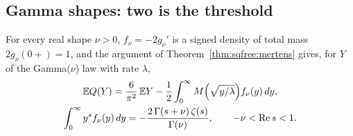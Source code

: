 \begin{table}[htbp]
\centering\footnotesize
\setlength{\tabcolsep}{3.5pt}
\caption{The Gamma(2) smoothed count: $Q_2(x)-6x/\pi^2$, the sum \eqref{eq:sqfree:EQ} truncated at $d\le2\times10^5$, the normalised error, the contribution $2\re\sum_{k\le100}B_{\rho_k}x^{\rho_k/2}$ of the first hundred atoms, the residues at $s=-1,\dots,-6$, whose leading part is $2c_1/x$, and the residual. The constant $1$ is the residue $D(0)$ at $s=0$. Computed at $45$ digits.}
\label{tab:sqfree:gamma2}
\end{table}

\subsection{Gamma shapes: two is the threshold}\label{sec:sqfree:shape}

For every real shape $\nu>0$, $f_\nu=-2g_\nu'$ is a signed density of total mass $2g_\nu(0+)=1$, and the argument of Theorem~\ref{thm:sqfree:mertens} gives, for $Y$ of the Gamma($\nu$) law with rate $\lambda$,
\begin{gather*}
\mathbb{E} Q(Y)=\frac6{\pi^2}\,\mathbb{E} Y-\frac12\int_0^\infty M\Big(\sqrt{y/\lambda}\Big)f_\nu(y)\,dy,\\
\int_0^\infty y^sf_\nu(y)\,dy=-\frac{2\,\Gamma(s+\nu)\,\zeta(s)}{\Gamma(\nu)},\qquad -\nu<\operatorname{Re} s<1 .
\end{gather*}


